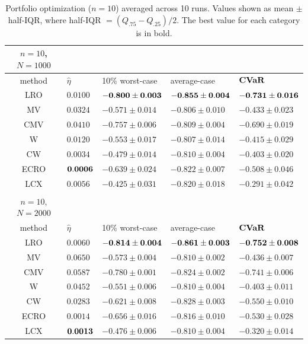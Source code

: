 \begin{table}[ht]
  \centering
  \fontsize{9}{11}\selectfont
{
	\begin{tabular}{cllll}   \toprule   
          $n=10$, $N=1000$ & & & & \\
         \midrule
		method & $\hat{\eta}$ & 10\% worst-case & average-case & $\mathop{\bf CVaR}$ \\
        \midrule
         LRO & $0.0100$ & $\bf{-0.800 \pm 0.003}$ & $\bf{-0.855 \pm 0.004}$ &$\bf{-0.731 \pm 0.016}$\\
        \midrule 
        MV & $0.0324$ & $-0.571 \pm 0.014$ & $-0.806 \pm 0.010$ &$-0.433 \pm 0.023$\\
        \midrule 
        CMV & $0.0410$ & $-0.757 \pm 0.006$ & $-0.809 \pm 0.004$ &$-0.690 \pm 0.019$\\
        \midrule 
        W & $0.0120$ & $-0.553 \pm 0.017$ & $-0.807 \pm 0.014$ &$-0.415 \pm 0.029$\\
        \midrule 
        CW & $0.0034$ & $-0.479 \pm 0.014$ & $-0.810 \pm 0.004$ &$-0.403 \pm 0.020$\\
        \midrule 
        ECRO & $\bf{0.0006}$ & $-0.639 \pm 0.024$ & $-0.822 \pm 0.007$ &$-0.508 \pm 0.046$\\
        \midrule 
        LCX & $0.0056$ & $-0.425 \pm 0.031$ & $-0.820 \pm 0.018$ &$-0.291 \pm 0.042$\\
        \bottomrule \\[-8pt]
                \toprule 
		$n=10$, $N=2000$ & & & & \\
             \midrule
		method & $\hat{\eta}$ & 10\% worst-case & average-case & $\mathop{\bf CVaR}$ \\
 \midrule
         LRO & $0.0060$ & $\bf{-0.814 \pm 0.004}$ & $\bf{-0.861 \pm 0.003}$ &$\bf{-0.752 \pm 0.008}$\\
        \midrule 
        MV & $0.0650$ & $-0.573 \pm 0.004$ & $-0.810 \pm 0.002$ &$-0.436 \pm 0.007$\\
        \midrule 
        CMV & $0.0587$ & $-0.780 \pm 0.001$ & $-0.824 \pm 0.002$ &$-0.741 \pm 0.006$\\
        \midrule 
        W & $0.0452$ & $-0.551 \pm 0.006$ & $-0.810 \pm 0.004$ &$-0.403 \pm 0.011$\\
        \midrule 
        CW & $0.0283$ & $-0.621 \pm 0.008$ & $-0.828 \pm 0.003$ &$-0.550 \pm 0.010$\\
        \midrule 
        ECRO & $0.0014$ & $-0.656 \pm 0.016$ & $-0.816 \pm 0.010$ &$-0.530 \pm 0.028$\\
        \midrule 
        LCX & $\bf{0.0013}$ & $-0.476 \pm 0.006$ & $-0.810 \pm 0.004$ &$-0.320 \pm 0.014$\\
 \bottomrule
		\end{tabular}}
		\caption{Portfolio optimization ($n=10$) averaged across 10 runs. Values shown as mean $\pm$ half-IQR, where half-IQR $= (Q_{.75} - Q_{.25})/2$. The best value for each category is in bold.}
		\label{table:port_n10}
        \vspace{-1em}
\end{table}

